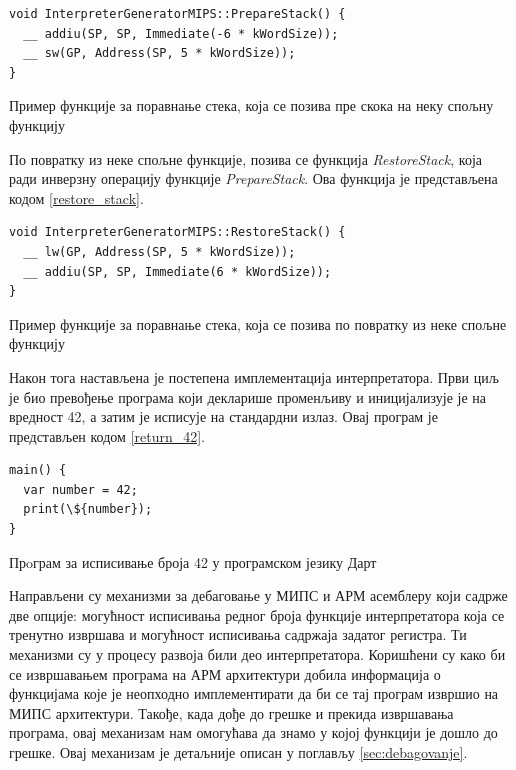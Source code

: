 \documentclass[12pt,oneside]{memoir}
\begin{document}
\begin{listing}
\begin{verbatim}
void InterpreterGeneratorMIPS::PrepareStack() {
  __ addiu(SP, SP, Immediate(-6 * kWordSize));
  __ sw(GP, Address(SP, 5 * kWordSize));
}
\end{verbatim}
\caption{Пример функције за поравнање стека, која се позива пре скока на неку спољну функцију}
\label{prepare_stack}
\end{listing}

По повратку из неке спољне функције, позива се функција \textit{RestoreStack}, која ради инверзну операцију функције \textit{PrepareStack}. Ова функција је представљена кодом \ref{restore_stack}.\\

\begin{listing}
\begin{verbatim}
void InterpreterGeneratorMIPS::RestoreStack() {
  __ lw(GP, Address(SP, 5 * kWordSize));
  __ addiu(SP, SP, Immediate(6 * kWordSize));
}
\end{verbatim}
\caption{Пример функције за поравнање стека, која се позива по повратку из неке спољне функцију}
\label{restore_stack}
\end{listing}

Након тога настављена је постепена имплементација интерпретатора. Први циљ је био превођење програма који декларише променљиву и иницијализује је на вредност 42, а затим је исписује на стандардни излаз. Овај програм је представљен кодом \ref{return_42}.\\

\begin{listing}
\begin{verbatim}
main() {
  var number = 42;
  print(\${number});
}
\end{verbatim}
\caption{Прoграм за исписивање броја 42 у програмском језику Дарт}
\label{return_42}
\end{listing}

Направљени су механизми за дебаговање у МИПС и АРМ асемблеру који садрже две опције: могућност исписивања редног броја функције интерпретатора која се тренутно извршава и могућност исписивања садржаја задатог регистра. Ти механизми су у процесу развоја били део интерпретатора. Коришћени су како би се извршавањем програма на АРМ архитектури добила информација о функцијама које је неопходно имплементирати да би се тај програм извршио на МИПС архитектури. Такође, када дође до грешке и прекида извршавања програма, овај механизам нам омогућава да знамо у којој функцији је дошло до грешке. Овај механизам је детаљније описан у поглављу \ref{sec:debagovanje}.
\end{document}
